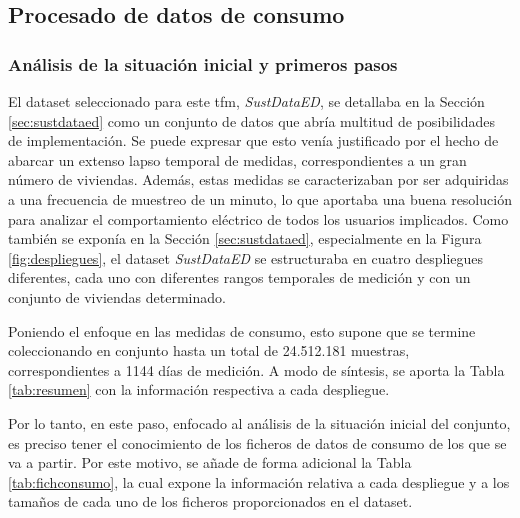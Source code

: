 \clearpage

\subsection{Procesado de datos de consumo}

\subsubsection{Análisis de la situación inicial y primeros pasos}
\label{sec:inicialproc}

El dataset seleccionado para este \gls{tfm}, \textit{SustDataED}, se detallaba en la Sección \ref{sec:sustdataed} como un conjunto de datos que abría multitud de posibilidades de implementación. Se puede expresar que esto venía justificado por el hecho de abarcar un extenso lapso temporal de medidas, correspondientes a un gran número de viviendas. Además, estas medidas se caracterizaban por ser adquiridas a una frecuencia de muestreo de un minuto, lo que aportaba una buena resolución para analizar el comportamiento eléctrico de todos los usuarios implicados. Como también se exponía en la Sección \ref{sec:sustdataed}, especialmente en la Figura \ref{fig:despliegues}, el dataset \textit{SustDataED} se estructuraba en cuatro despliegues diferentes, cada uno con diferentes rangos temporales de medición y con un conjunto de viviendas determinado. 

\vspace{3mm}

Poniendo el enfoque en las medidas de consumo, esto supone que se termine coleccionando en conjunto hasta un total de 24.512.181 muestras, correspondientes a 1144 días de medición. A modo de síntesis, se aporta la Tabla \ref{tab:resumen} con la información respectiva a cada despliegue. \cite{sustdata}

\vspace{3mm}

Por lo tanto, en este paso, enfocado al análisis de la situación inicial del conjunto, es preciso tener el conocimiento de los ficheros de datos de consumo de los que se va a partir. Por este motivo, se añade de forma adicional la Tabla \ref{tab:fichconsumo}, la cual expone la información relativa a cada despliegue y a los tamaños de cada uno de los ficheros proporcionados en el dataset.

\vspace{3mm}

